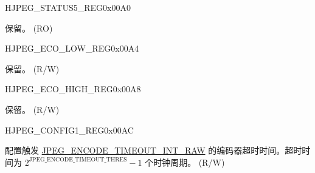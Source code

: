 \begin{register}{H}{JPEG\_STATUS5\_REG}{0x00A0}\label{regdesc:JPEGSTATUS5REG}
%
%
\regnewline%
\begin{regdesc}\begin{reglist}
\label{fielddesc:JPEGPICBLOCKNUM}\item [JPEG\_PIC\_BLOCK\_NUM] 保留。 (RO)
\end{reglist}\end{regdesc}
\end{register}


\begin{register}{H}{JPEG\_ECO\_LOW\_REG}{0x00A4}\label{regdesc:JPEGECOLOWREG}
%
\regnewline%
\begin{regdesc}\begin{reglist}
\label{fielddesc:JPEGRDNECOLOW}\item [JPEG\_RDN\_ECO\_LOW] 保留。 (R/W)
\end{reglist}\end{regdesc}
\end{register}


\begin{register}{H}{JPEG\_ECO\_HIGH\_REG}{0x00A8}\label{regdesc:JPEGECOHIGHREG}
%
\regnewline%
\begin{regdesc}\begin{reglist}
\label{fielddesc:JPEGRDNECOHIGH}\item [JPEG\_RDN\_ECO\_HIGH] 保留。 (R/W)
\end{reglist}\end{regdesc}
\end{register}


\begin{register}{H}{JPEG\_CONFIG1\_REG}{0x00AC}\label{regdesc:JPEGCONFIG1REG}
%
%
\regnewline%
\begin{regdesc}\begin{reglist}
\label{fielddesc:JPEGENCODETIMEOUTTHRES}\item [JPEG\_ENCODE\_TIMEOUT\_THRES] 配置触发 \hyperref[fielddesc:JPEGENCODETIMEOUTINTRAW]{JPEG\_ENCODE\_TIMEOUT\_INT\_RAW} 的编码器超时时间。超时时间为 $2^{\mathrm{JPEG\_ENCODE\_TIMEOUT\_THRES}} - 1$ 个时钟周期。 (R/W)
\end{reglist}\end{regdesc}
\end{register}


